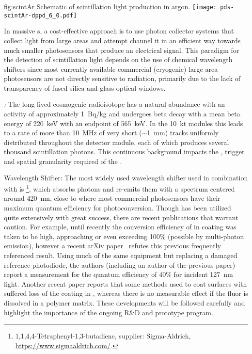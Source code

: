 \begin{dunefigure}{fig:scintAr}
{Schematic of scintillation light production in argon.}
\texttt{[image: pds-scintAr-dppd\_6\_0.pdf]}
\end{dunefigure}

In massive \lartpc{}s, a cost-effective approach is to use photon collector systems that collect light from large areas and attempt channel it in an efficient way towards much smaller photosensors that produce an electrical signal.
This paradigm for the detection of \lar scintillation light depends on the use of chemical wavelength shifters since most currently available commercial (cryogenic) large area photosensors are not directly sensitive to  radiation, primarily due to the lack of transparency of fused silica and glass optical windows. 

\emph{:}  The long-lived cosmogenic radioisotope  has a natural abundance with an activity of approximately \SI{1}{Bq/kg} and
undergoes beta decay with a mean beta energy of \SI{220}{keV} with an endpoint of \SI{565}{keV}. In the \SI{10}{kt}  modules this leads to a rate of more than \SI{10}{MHz} of very short ($\sim$\SI{1}{mm}) tracks uniformly distributed throughout the detector module, each of which produces several thousand  scintillation photons. This continuous background impacts the , trigger and spatial granularity required of the .

Wavelength Shifter: The most widely used wavelength shifter used in combination with \lar is \footnote{1,1,4,4-Tetraphenyl-1,3-butadiene, supplier: Sigma-Aldrich\textregistered{}, \url{https://www.sigmaaldrich.com/}.}, which absorbs  photons and re-emits them with a spectrum centered around \SI{420}{nm}, close to where most commercial photosensors have their maximum quantum efficiency for photoconversion. 
Though  has been utilized quite extensively with great success, there are recent publications that warrant caution. For example, until recently the conversion efficiency of  in coating was taken to be high, approaching or even exceeding \num{100}\% (possible by multi-photon emission), however a recent arXiv paper~\cite{Benson:2017vbw} refutes this previous frequently referenced result. Using much of the same equipment but replacing a damaged reference photodiode, the authors (including an author of the previous paper) report a measurement for the quantum efficiency of \num{40}\% for incident \SI{127}{nm} light. 
Another recent paper\cite{Asaadi:2018ixs} reports that some methods used to coat surfaces with  suffered loss of the  coating in \lar, whereas there is no measurable effect if the fluor is dissolved in a polymer matrix. These developments will be followed carefully and highlight the importance of the ongoing R\&D and prototype program.


